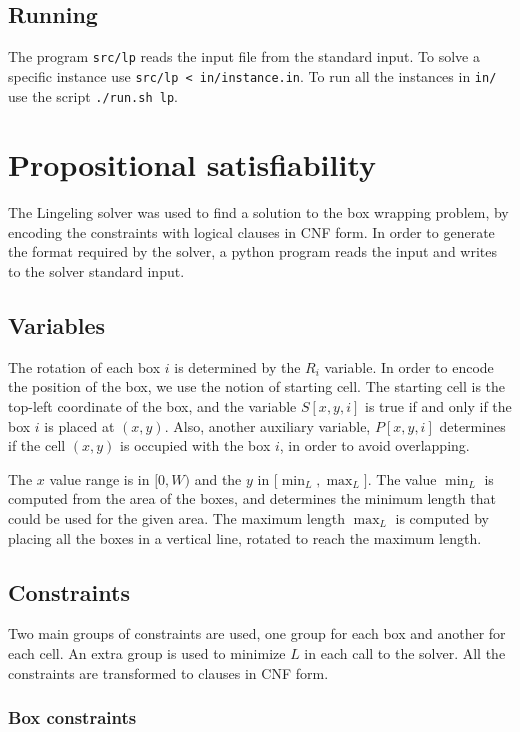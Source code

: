 \documentclass[a4paper]{article}
\begin{document}
\subsection{Running}

The program \texttt{src/lp} reads the input file from the standard input. To 
solve a specific instance use \texttt{src/lp < in/instance.in}. To run all the 
instances in \texttt{in/} use the script \texttt{./run.sh lp}.

\section{Propositional satisfiability}

The Lingeling solver was used to find a solution to the box wrapping problem, by 
encoding the constraints with logical clauses in CNF form. In order to generate 
the format required by the solver, a python program reads the input and writes 
to the solver standard input.

\subsection{Variables}

The rotation of each box $i$ is determined by the $R_i$ variable. In order to 
encode the position of the box, we use the notion of starting cell. The starting 
cell is the top-left coordinate of the box, and the variable $S[x,y,i]$ is true 
if and only if the box $i$ is placed at $(x,y)$. Also, another auxiliary 
variable, $P[x,y,i]$ determines if the cell $(x,y)$ is occupied with the box 
$i$, in order to avoid overlapping.

The $x$ value range is in $[0,W)$ and the $y$ in [$\min_L, \max_L]$. The value 
$\min_L$ is computed from the area of the boxes, and determines the minimum 
length that could be used for the given area. The maximum length $\max_L$ is 
computed by placing all the boxes in a vertical line, rotated to reach the 
maximum length.

\subsection{Constraints}

Two main groups of constraints are used, one group for each box and another for 
each cell. An extra group is used to minimize $L$ in each call to the solver.  
All the constraints are transformed to clauses in CNF form.

\subsubsection{Box constraints}
\end{document}
